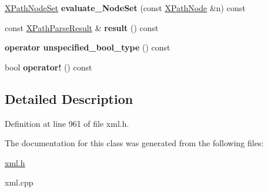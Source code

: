 \begin{DoxyCompactItemize}
\item 
\hypertarget{classphys_1_1xml_1_1XPathQuery_a3b9b33f1db717e2f356e766c97c71f8c}{
\hyperlink{classphys_1_1xml_1_1XPathNodeSet}{XPathNodeSet} {\bfseries evaluate\_\-NodeSet} (const \hyperlink{classphys_1_1xml_1_1XPathNode}{XPathNode} \&n) const }
\label{de/d52/classphys_1_1xml_1_1XPathQuery_a3b9b33f1db717e2f356e766c97c71f8c}

\item 
\hypertarget{classphys_1_1xml_1_1XPathQuery_ab2d3a78adf02f6e1546fc60203884877}{
const \hyperlink{structphys_1_1xml_1_1XPathParseResult}{XPathParseResult} \& {\bfseries result} () const }
\label{de/d52/classphys_1_1xml_1_1XPathQuery_ab2d3a78adf02f6e1546fc60203884877}

\item 
\hypertarget{classphys_1_1xml_1_1XPathQuery_a783704bb9a83379b6c8dadbfb5a835ce}{
{\bfseries operator unspecified\_\-bool\_\-type} () const }
\label{de/d52/classphys_1_1xml_1_1XPathQuery_a783704bb9a83379b6c8dadbfb5a835ce}

\item 
\hypertarget{classphys_1_1xml_1_1XPathQuery_a6dc902dc41beff8cf60e978fa2dc8861}{
bool {\bfseries operator!} () const }
\label{de/d52/classphys_1_1xml_1_1XPathQuery_a6dc902dc41beff8cf60e978fa2dc8861}

\end{DoxyCompactItemize}


\subsection{Detailed Description}


Definition at line 961 of file xml.h.



The documentation for this class was generated from the following files:\begin{DoxyCompactItemize}
\item 
\hyperlink{xml_8h}{xml.h}\item 
xml.cpp\end{DoxyCompactItemize}
